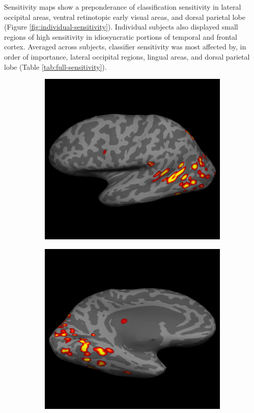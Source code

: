 \documentclass[review,1p,authoryear]{elsarticle}
\begin{document}
Sensitivity maps show a preponderance of classification sensitivity in
lateral occipital areas, ventral retinotopic early visual areas, and dorsal parietal lobe (Figure \ref{fig:individual-sensitivity}). 
Individual subjects also displayed small regions of high sensitivity in idiosyncratic portions of temporal and frontal cortex. 
Averaged across subjects, classifier sensitivity was most affected by, in order of importance, lateral occipital regions, lingual areas, and dorsal parietal lobe (Table \ref{tab:full-sensitivity}). 

\begin{figure}[p]
\centering
\begin{subfigure}{0.3\textwidth}
\centering
\includegraphics[width=\textwidth]{figures/s1-lh-lateral-sensitivity}
\caption{}
\label{fig:s1-lh-lateral-sensitivity}
\end{subfigure}
\begin{subfigure}{0.3\textwidth}
\centering
\includegraphics[width=\textwidth]{figures/s1-lh-medial-sensitivity}

\end{subfigure}
\end{figure}
\end{document}
